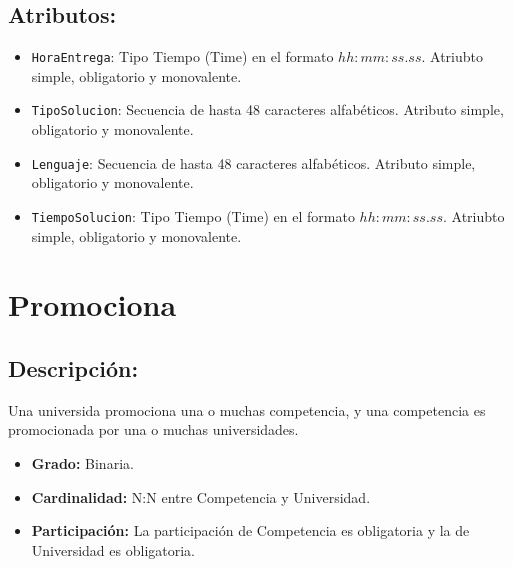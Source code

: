 \documentclass[doc, 12pt, donotrepeattitle]{apa6}
\begin{document}
\subsection*{Atributos:}
\begin{itemize}
\item \texttt{HoraEntrega}: Tipo Tiempo (Time) en el formato $hh:mm:ss.ss$. Atriubto simple, obligatorio y monovalente.
\item \texttt{TipoSolucion}: Secuencia de hasta 48 caracteres alfabéticos. Atributo simple, obligatorio y monovalente.
\item \texttt{Lenguaje}: Secuencia de hasta 48 caracteres alfabéticos. Atributo simple, obligatorio y monovalente.
\item \texttt{TiempoSolucion}: Tipo Tiempo (Time) en el formato $hh:mm:ss.ss$. Atriubto simple, obligatorio y monovalente.
\end{itemize}

\section*{Promociona}
\subsection*{Descripción:}
Una universida promociona una o muchas competencia, y una competencia es promocionada por una o muchas universidades.
\begin{itemize}
\item \textbf{Grado:} Binaria.
\item \textbf{Cardinalidad:} N:N entre Competencia y Universidad.
\item \textbf{Participación:} La participación de Competencia es obligatoria y la de Universidad es obligatoria.
\end{itemize}
\end{document}
